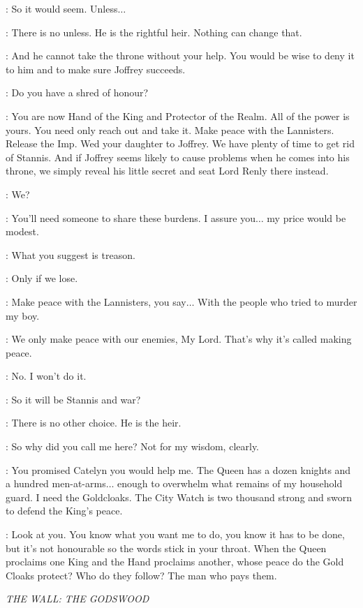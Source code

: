 \LITTLEFINGER: So it would seem. Unless$\ldots$ 

\NED: There is no unless. He is the rightful heir. Nothing can change that. 

\LITTLEFINGER: And he cannot take the throne without your help. You would be wise to deny it to him and to make sure Joffrey succeeds. 

\NED: Do you have a shred of honour? 

\LITTLEFINGER: You are now Hand of the King and Protector of the Realm. All of the power is yours. You need only reach out and take it. Make peace with the Lannisters. Release the Imp. Wed your daughter to Joffrey. We have plenty of time to get rid of Stannis. And if Joffrey seems likely to cause problems when he comes into his throne, we simply reveal his little secret and seat Lord Renly there instead. 

\NED: We? 

\LITTLEFINGER: You'll need someone to share these burdens. I assure you$\ldots$ my price would be modest. 

\NED: What you suggest is treason. 

\LITTLEFINGER: Only if we lose. 

\NED: Make peace with the Lannisters, you say$\ldots$ With the people who tried to murder my boy. 

\LITTLEFINGER: We only make peace with our enemies, My Lord. That's why it's called making peace. 

\NED: No. I won't do it. 

\LITTLEFINGER: So it will be Stannis and war? 

\NED: There is no other choice. He is the heir. 

\LITTLEFINGER: So why did you call me here? Not for my wisdom, clearly. 

\NED: You promised Catelyn you would help me. The Queen has a dozen knights and a hundred men-at-arms$\ldots$ enough to overwhelm what remains of my household guard. I need the Goldcloaks. The City Watch is two thousand strong and sworn to defend the King's peace. 

\LITTLEFINGER: Look at you. You know what you want me to do, you know it has to be done, but it's not honourable so the words stick in your throat. When the Queen proclaims one King and the Hand proclaims another, whose peace do the Gold Cloaks protect? Who do they follow? The man who pays them. 


\scene

\textit{THE WALL: THE GODSWOOD} 

